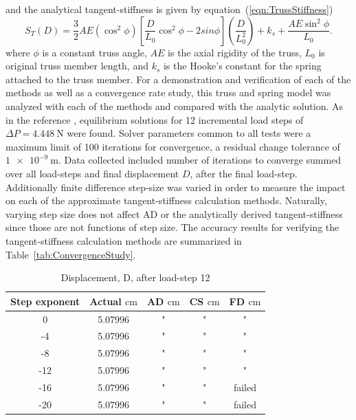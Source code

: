 \documentclass[preprint,12pt]{elsarticle}
\begin{document}
%
and the analytical tangent-stiffness is given by equation~(\ref{eqn:TrussStiffness})
%
\begin{equation} 
    \label{eqn:TrussStiffness}
    S_{T}(D) = \frac 3 2 AE(\cos^{2}\phi)[\frac{D}{L_{0}}\cos^{2}\phi - 2sin\phi](\frac{D}{L_{0}^{2}}) + k_{s} + \frac{AE\sin^{2}\phi}{L_{0}}.
\end{equation}
%
where $\phi$ is a constant truss angle, $AE$ is the axial rigidity of the truss, $L_{0}$ is original truss member length, and $k_{s}$ is the Hooke's constant for the spring attached to the truss member. For a demonstration and verification of each of the methods as well as a convergence rate study, this truss and spring model was analyzed with each of the methods and compared with the analytic solution. As in the reference \cite{rezaiee2010dynamic}, equilibrium solutions for 12 incremental load steps of $\Delta P=\SI{4.448}{\newton}$ were found. Solver parameters common to all tests were a maximum limit of 100 iterations for convergence, a residual change tolerance of $\SI{1e-9}{\meter}$.  Data collected included number of iterations to converge summed over all load-steps and final displacement $D$, after the final load-step. Additionally finite difference step-size was varied in order to measure the impact on each of the approximate tangent-stiffness calculation methods. Naturally, varying step size does not affect AD or the analytically derived tangent-stiffness since those are not functions of step size. The accuracy results for verifying the tangent-stiffness calculation methods are summarized in Table~\ref{tab:ConvergenceStudy}. 
%
\begin{table}[tbp]    
  \centering
        \caption{Displacement, D, after load-step 12} \label{tab:Verification}   
        \begin{tabular}{c c c c c}
         \toprule
         Step exponent & Actual $\si{\centi\meter}$ & AD $\si{\centi\meter}$ & CS $\si{\centi\meter}$ & FD $\si{\centi\meter}$\\ 
        \midrule
        0 & 5.07996 & " & " & "\\
        -4 & 5.07996 & " & " & "\\
        -8 & 5.07996 & " & " & "\\
        -12 & 5.07996 & " & " & " \\
        -16 & 5.07996 & " & " & failed \\
        -20 & 5.07996 & " & " & failed \\
        \bottomrule
    \end{tabular}
\end{table}
\end{document}
